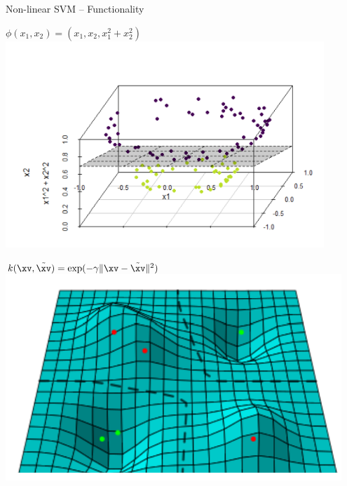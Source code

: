 \documentclass[11pt,compress,t,notes=noshow, xcolor=table]{beamer}
\begin{document}
\begin{frame}{Non-linear SVM -- Functionality}
\medskip
 \footnotesize
 \begin{minipage}{0.48\textwidth}
\centering
  $\phi(x_1, x_2) = (x_1, x_2, x_1^2+x_2^2)$
 \includegraphics[width=0.9\textwidth]{figure/nonlin_svn_kernel.png}
 \end{minipage}
  \footnotesize
 \begin{minipage}{0.48\textwidth}
 \centering
 $k(\xv, \tilde \xv) = \exp(-\gamma \|\xv - \tilde \xv\|^2)$
 \includegraphics[width=0.95\textwidth]{figure/nonlin-svm-rbf.png}
   
 \end{minipage}

\end{frame}

\end{document}
